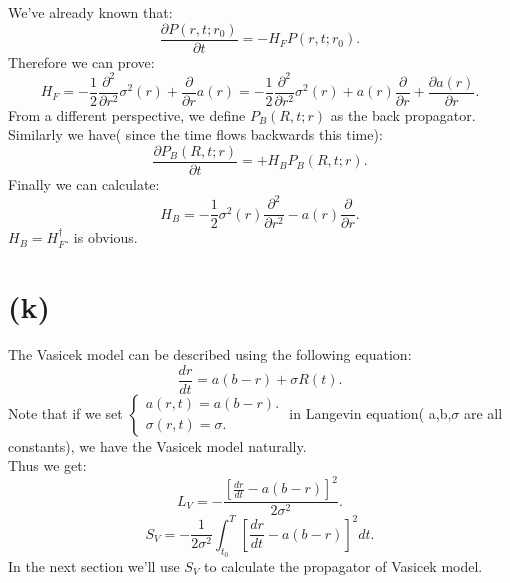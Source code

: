 \documentclass[12pt,a4paper]{paper}
\begin{document}
\indent We've already known that:
\begin{equation}
\frac{\partial P(r,t;r_0)}{\partial t}=-H_{F}P(r,t;r_0).
\end{equation}
Therefore we can prove:
\begin{equation}
H_{F}=-\frac{1}{2}\frac{\partial^2 }{\partial r^2}\sigma ^2(r)+\frac{\partial }{\partial r}a(r)=-\frac{1}{2}\frac{\partial^2 }{\partial r^2}\sigma ^2(r)+a(r)\frac{\partial }{\partial r}+\frac{\partial a(r)}{\partial r}.
\end{equation}
\indent From a different perspective, we define $P_{B}(R,t;r)$ as the back propagator.\\
\indent Similarly we have( since the time flows backwards this time):
\begin{equation}
\frac{\partial P_{B}(R,t;r)}{\partial t}=+H_{B}P_{B}(R,t;r).
\end{equation}
\indent Finally we can calculate:
\begin{equation}
H_{B}=-\frac{1}{2}\sigma ^2(r)\frac{\partial^2 }{\partial r^2}-a(r)\frac{\partial }{\partial r}.
\end{equation}
$H_{B}=H_{F}^{\dag}.$ is obvious.

\section{(k)}
The Vasicek model can be described using the following equation:
\begin{equation}
\frac{dr}{dt}=a(b-r)+\sigma R(t).
\end{equation}
\indent Note that if we set 
$\left\{\begin{matrix}
a(r,t)=a(b-r).\\
\sigma (r,t)=\sigma .
\end{matrix}\right.$ in Langevin equation( a,b,$\sigma$ are all constants), we have the Vasicek model naturally.\\
\indent Thus we get:
\begin{equation}
L_{V}=-\frac{[\frac{dr}{dt}-a(b-r)]^2}{2\sigma ^2}.
\end{equation}
\begin{equation}
S_{V}=-\frac{1}{2\sigma ^2}\int_{t_0}^{T}[\frac{dr}{dt}-a(b-r)]^2 dt.
\end{equation}
In the next section we'll use $S_{V}$ to calculate the propagator of Vasicek model.
\end{document}

